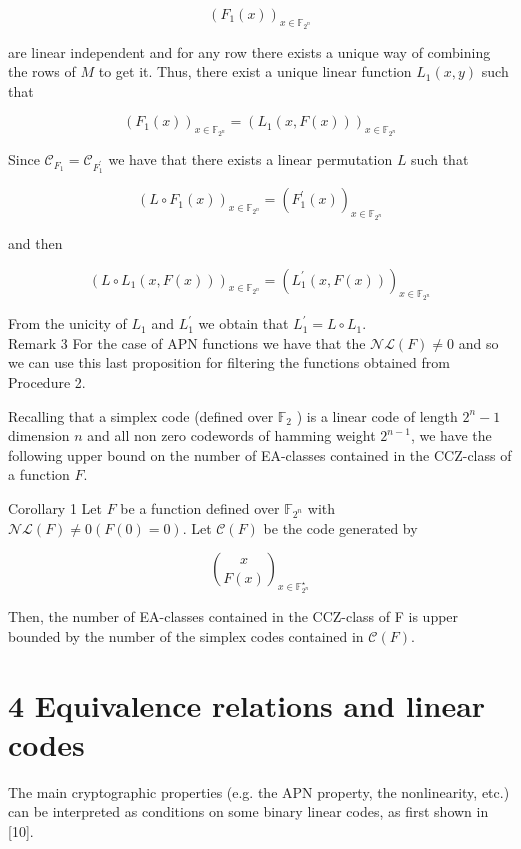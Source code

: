 \documentclass[10pt]{article}
\begin{document}
$$
\left(F_{1}(x)\right)_{x \in \mathbb{F}_{2^{n}}}
$$

are linear independent and for any row there exists a unique way of combining the rows of $M$ to get it. Thus, there exist a unique linear function $L_{1}(x, y)$ such that

$$
\left(F_{1}(x)\right)_{x \in \mathbb{F}_{2^{n}}}=\left(L_{1}(x, F(x))\right)_{x \in \mathbb{F}_{2^{n}}}
$$

Since $\mathscr{C}_{F_{1}}=\mathscr{C}_{F_{1}^{\prime}}$ we have that there exists a linear permutation $L$ such that

$$
\left(L \circ F_{1}(x)\right)_{x \in \mathbb{F}_{2^{n}}}=\left(F_{1}^{\prime}(x)\right)_{x \in \mathbb{F}_{2^{n}}}
$$

and then

$$
\left(L \circ L_{1}(x, F(x))\right)_{x \in \mathbb{F}_{2^{n}}}=\left(L_{1}^{\prime}(x, F(x))\right)_{x \in \mathbb{F}_{2^{n}}}
$$

From the unicity of $L_{1}$ and $L_{1}^{\prime}$ we obtain that $L_{1}^{\prime}=L \circ L_{1}$.\\
Remark 3 For the case of APN functions we have that the $\mathscr{N} \mathscr{L}(F) \neq 0$ and so we can use this last proposition for filtering the functions obtained from Procedure 2.

Recalling that a simplex code (defined over $\mathbb{F}_{2}$ ) is a linear code of length $2^{n}-1$ dimension $n$ and all non zero codewords of hamming weight $2^{n-1}$, we have the following upper bound on the number of EA-classes contained in the CCZ-class of a function $F$.

Corollary 1 Let $F$ be a function defined over $\mathbb{F}_{2^{n}}$ with $\mathscr{N} \mathscr{L}(F) \neq 0(F(0)=0)$. Let $\mathscr{C}(F)$ be the code generated by

$$
\binom{x}{F(x)}_{x \in \mathbb{F}_{2^{n}}^{\star}}
$$

Then, the number of EA-classes contained in the CCZ-class of F is upper bounded by the number of the simplex codes contained in $\mathscr{C}(F)$.

\section*{4 Equivalence relations and linear codes}
The main cryptographic properties (e.g. the APN property, the nonlinearity, etc.) can be interpreted as conditions on some binary linear codes, as first shown in [10].
\end{document}
